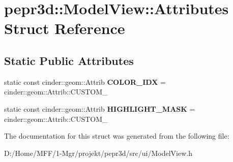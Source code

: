 \hypertarget{structpepr3d_1_1_model_view_1_1_attributes}{}\section{pepr3d\+::Model\+View\+::Attributes Struct Reference}
\label{structpepr3d_1_1_model_view_1_1_attributes}
\subsection*{Static Public Attributes}
\begin{DoxyCompactItemize}
\item 
\mbox{\label{structpepr3d_1_1_model_view_1_1_attributes_a6dd0effe7c9edda9790ae4bd0ab9c47c}} 
static const cinder\+::geom\+::\+Attrib {\bfseries C\+O\+L\+O\+R\+\_\+\+I\+DX} = cinder\+::geom\+::\+Attrib\+::\+C\+U\+S\+T\+O\+M\+\_
\item 
\mbox{\label{structpepr3d_1_1_model_view_1_1_attributes_a41e9300964942d8c5ce120a104214c33}} 
static const cinder\+::geom\+::\+Attrib {\bfseries H\+I\+G\+H\+L\+I\+G\+H\+T\+\_\+\+M\+A\+SK} = cinder\+::geom\+::\+Attrib\+::\+C\+U\+S\+T\+O\+M\+\_
\end{DoxyCompactItemize}


The documentation for this struct was generated from the following file\+:\begin{DoxyCompactItemize}
\item 
D\+:/\+Home/\+M\+F\+F/1-\/\+Mgr/projekt/pepr3d/src/ui/Model\+View.\+h\end{DoxyCompactItemize}
